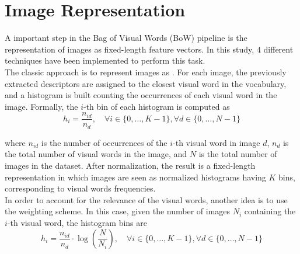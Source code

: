 \documentclass[../main.tex]{subfiles}
\begin{document}
\section{Image Representation}\label{sec:image-representation}

A important step in the Bag of Visual Words (BoW) pipeline is the representation
of images as fixed-length feature vectors. In this study, $4$ different
techniques have been implemented to perform this task.\\
The classic approach is to represent images as . For each image, the previously extracted descriptors are
assigned to the closest visual word in the vocabulary, and a histogram is built
counting the occurrences of each visual word in the image. Formally, the $i$-th
bin of each histogram is computed as
\begin{equation}
	h_i = \frac{n_{id}}{n_{d}},
	\quad
	\forall i \in \{0, \ldots, K-1\},
	\forall d \in \{0, \ldots, N-1\}
\end{equation}

where 
$n_{id}$ is the number of occurrences of the $i$-th visual word in image $d$,
$n_{d}$ is the total number of visual words in the image,
and $N$ is the total number of images in the dataset.
After normalization,
the result is a fixed-length representation in which images are seen as
normalized histograms having $K$ bins, corresponding to visual words
frequencies.\\
In order to account for the relevance of the visual words, another idea is to
use the  weighting
scheme. In this case, given the number of images $N_i$ containing the $i$-th
visual word, the histogram bins are
\begin{equation}
	h_i = \frac{n_{id}}{n_{d}} \cdot \log\left(\frac{N}{N_i}\right),
	\quad 
	\forall i \in \{0, \ldots, K-1\}, 
	\forall d \in \{0, \ldots, N-1\}
\end{equation}
\end{document}
